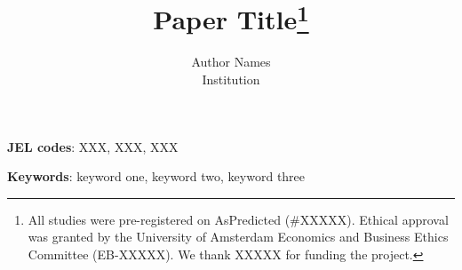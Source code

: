 \documentclass[12pt]{article}
\title{Paper Title\thanks{All studies were pre-registered on AsPredicted (\#XXXXX). Ethical approval was granted by the University of Amsterdam Economics and Business Ethics Committee (EB-XXXXX). We thank XXXXX for funding the project.}}
\author{Author Names \\[0.5em] \small Institution}
\begin{document}
\maketitle
\thispagestyle{empty}

\begin{abstract}
\noindent

\end{abstract}

\medskip
\noindent \textbf{JEL codes}: XXX, XXX, XXX

\smallskip
\noindent \textbf{Keywords}: keyword one, keyword two, keyword three

\newpage
{}







\newpage



\newpage
\appendix
\renewcommand{\thefigure}{\thesection.\arabic{figure}}
\renewcommand{\thetable}{\thesection.\arabic{table}}

\newpage
\setcounter{figure}{0}
\setcounter{table}{0}


\newpage
\setcounter{figure}{0}
\setcounter{table}{0}


% 
\end{document}

